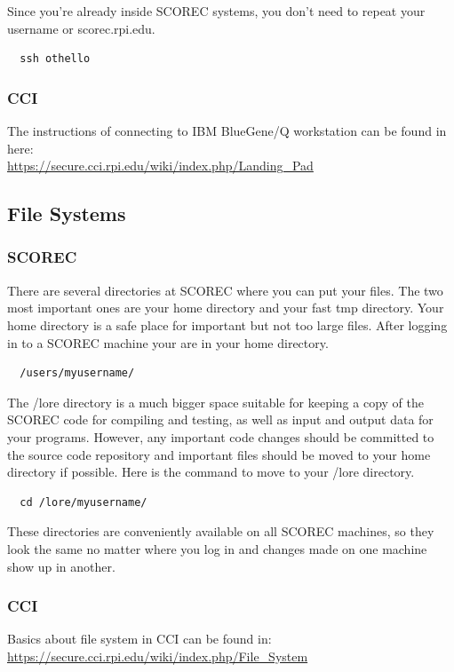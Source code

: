 \documentclass{article}
\begin{document}
Since you're already inside SCOREC systems, you don't need to repeat your username or scorec.rpi.edu.

\begin{lstlisting}
  ssh othello
\end{lstlisting}

\subsubsection{CCI}
The instructions of connecting to IBM BlueGene/Q workstation can be found in here: \\
\url{https://secure.cci.rpi.edu/wiki/index.php/Landing_Pad}

\subsection{File Systems}
\subsubsection{SCOREC}
There are several directories at SCOREC where you can put your files. The two most important ones are your home directory and your fast tmp directory. Your home directory is a safe place for important but not too large files. After logging in to a SCOREC machine your are in your home directory.
\begin{lstlisting}
  /users/myusername/
\end{lstlisting}
The /lore directory is a much bigger space suitable for keeping a copy of the SCOREC code for compiling and testing, as well as input and output data for your programs. However, any important code changes should be committed to the source code repository and important files should be moved to your home directory if possible. Here is the command to move to your /lore directory.
\begin{lstlisting}
  cd /lore/myusername/
\end{lstlisting}

These directories are conveniently available on all SCOREC machines, so they look the same no matter where you log in and changes made on one machine show up in another.

\subsubsection{CCI}
Basics about file system in CCI can be found in: \\
\url{https://secure.cci.rpi.edu/wiki/index.php/File\_System}
\end{document}

